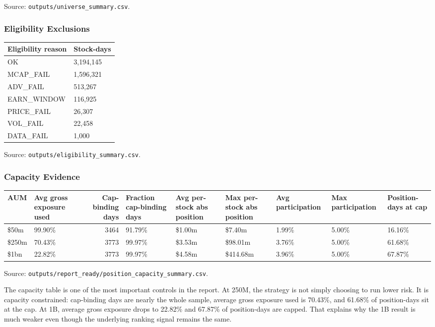 \documentclass[
]{article}
\begin{document}
Source: \texttt{outputs/universe\_summary.csv}.

\hypertarget{eligibility-exclusions}{%
\subsubsection{Eligibility Exclusions}\label{eligibility-exclusions}}

\begin{longtable}[]{@{}ll@{}}
\toprule
Eligibility reason & Stock-days \\
\midrule
\endhead
OK & 3,194,145 \\
MCAP\_FAIL & 1,596,321 \\
ADV\_FAIL & 513,267 \\
EARN\_WINDOW & 116,925 \\
PRICE\_FAIL & 26,307 \\
VOL\_FAIL & 22,458 \\
DATA\_FAIL & 1,000 \\
\bottomrule
\end{longtable}

Source: \texttt{outputs/eligibility\_summary.csv}.

\hypertarget{capacity-evidence}{%
\subsubsection{Capacity Evidence}\label{capacity-evidence}}

\begin{longtable}[]{@{}llrllllll@{}}
\toprule
AUM & Avg gross exposure used & Cap-binding days & Fraction cap-binding
days & Avg per-stock abs position & Max per-stock abs position & Avg
participation & Max participation & Position-days at cap \\
\midrule
\endhead
\$50m & 99.90\% & 3464 & 91.79\% & \$1.00m & \$7.40m & 1.99\% & 5.00\% &
16.16\% \\
\$250m & 70.43\% & 3773 & 99.97\% & \$3.53m & \$98.01m & 3.76\% & 5.00\%
& 61.68\% \\
\$1bn & 22.82\% & 3773 & 99.97\% & \$4.58m & \$414.68m & 3.96\% & 5.00\%
& 67.87\% \\
\bottomrule
\end{longtable}

Source: \texttt{outputs/report\_ready/position\_capacity\_summary.csv}.

The capacity table is one of the most important controls in the report.
At 250M, the strategy is not simply choosing to run lower risk. It is
capacity constrained: cap-binding days are nearly the whole sample,
average gross exposure used is 70.43\%, and 61.68\% of position-days sit
at the cap. At 1B, average gross exposure drops to 22.82\% and 67.87\%
of position-days are capped. That explains why the 1B result is much
weaker even though the underlying ranking signal remains the same.
\end{document}
